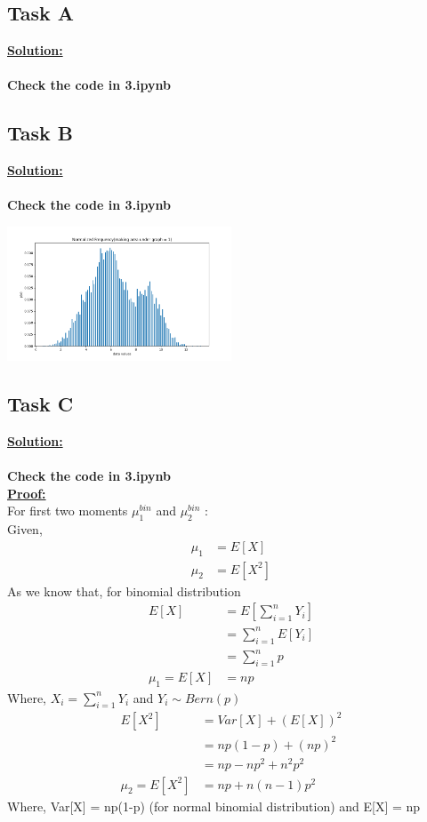 \documentclass[12pt]{article}
\begin{document}
\subsection{Task A}
\textbf{\underline{Solution:}}\\
\\
\textbf{Check the code in 3.ipynb}
\subsection{Task B}
\textbf{\underline{Solution:}}\\
\\
\textbf{Check the code in 3.ipynb}
\begin{minipage}{\linewidth}
    \begin{center}
        \includegraphics[width=0.5\textwidth]{images/3b.png}
    \end{center}
\end{minipage}
\subsection{Task C}
\textbf{\underline{Solution:}}\\
\\
\textbf{Check the code in 3.ipynb}
\\
\textbf{\underline{Proof: }}
\\
For first two moments $\mu_1^{bin}$ and $\mu_2^{bin}$ :
\\
Given,
\begin{equation}
\begin{split}
    \mu_1 &= E[X] \\
    \mu_2 &= E[X^2]
\end{split}
\end{equation}
As we know that, for binomial distribution
\begin{equation}
\begin{split}
     E[X] &= E[\sum_{i=1}^{n}Y_i]\\
          &= \sum_{i=1}^{n}E[Y_i]\\
          &= \sum_{i=1}^{n}p\\
     \mu_1 = E[X] &= np
\end{split}
\end{equation}
Where, $X_i = \sum_{i=1}^{n}Y_i$ and $Y_i \sim Bern(p)$
\begin{equation}
\begin{split}
     E[X^2] &= Var[X] + (E[X])^2\\
          &= np(1-p) + (np)^2\\
          &= np - n{p}^2 + n^2p^2\\
     \mu_2 = E[X^2] &= np + n(n-1)p^2
\end{split}
\end{equation}
Where, Var[X] = np(1-p) (for normal binomial distribution) and E[X] = np
\end{document}
